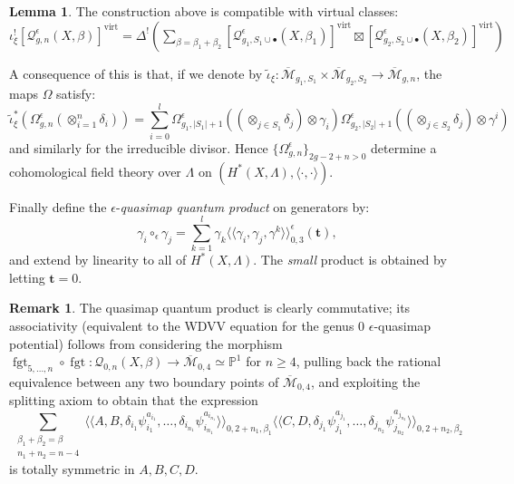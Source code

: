 \documentclass[11pt]{amsart}
\newcommand{\oM}{\overline{\mathcal{M}}}
\newcommand{\Q}[4]{\mathcal{Q}_{#1,#2}(#3,#4)}
\newcommand{\Qe}[4]{\mathcal{Q}^{\epsilon}_{#1,#2}(#3,#4)}
\newcommand{\PP}{\mathbb P}
\renewcommand{\to}{\rightarrow}
\newcommand{\virt}[1]{[#1]^{\operatorname{virt}}}
\newcommand{\lala}{\langle\!\langle}
\newcommand{\rara}{\rangle\!\rangle}
\newcommand{\fgt}{\operatorname{fgt}}
\theoremstyle{definition}
\newtheorem{lem}[thm]{Lemma}
\theoremstyle{definition}
\newtheorem{rmk}[thm]{Remark}
\begin{document}
\begin{lem} The construction above is compatible with virtual classes:
 $\iota_\xi^!\virt{\Qe{g}{n}{X}{\beta}}=\Delta^!\left(\sum_{\beta=\beta_1+\beta_2}\virt{\Qe{g_1}{S_1\cup\bullet}{X}{\beta_1}}\boxtimes\virt{\Qe{g_2}{S_2\cup\bullet}{X}{\beta_2}}\right)$
\end{lem}

A consequence of this is that, if we denote by $\tilde{\iota}_\xi\colon \oM_{g_1,S_1}\times \oM_{g_2,S_2}\to \oM_{g,n}$, the maps $\Omega$ satisfy:
\[\tilde{\iota}_\xi^*(\Omega^\epsilon_{g,n}(\otimes_{i=1}^n\delta_i))=\sum_{i=0}^l\Omega^\epsilon_{g_1,\lvert S_1\rvert+1}((\otimes_{j\in S_1}\delta_j)\otimes \gamma_i)\Omega^\epsilon_{g_2,\lvert S_2\rvert+1}((\otimes_{j\in S_2}\delta_j)\otimes \gamma^i)\]
and similarly for the irreducible divisor. Hence $\{\Omega^\epsilon_{g,n}\}_{2g-2+n>0}$ determine a cohomological field theory over $\Lambda$ on $(H^*(X,\Lambda),\langle\cdot,\cdot\rangle)$.

Finally define the $\epsilon$-\emph{quasimap quantum product} on generators by:
\[\gamma_i\circ_\epsilon \gamma_j=\sum_{k=1}^l\gamma_k\lala\gamma_i,\gamma_j,\gamma^k\rara^\epsilon_{0,3}(\mathbf{t}),\]
and extend by linearity to all of $H^*(X,\Lambda)$. The \emph{small} product is obtained by letting $\mathbf t=0$.

\begin{rmk}
 The quasimap quantum product is clearly commutative; its associativity (equivalent to the WDVV equation for the genus $0$ $\epsilon$-quasimap potential) follows from considering the morphism $\fgt_{5,\ldots,n}\circ\fgt\colon \Q{0}{n}{X}{\beta}\to\oM_{0,4}\simeq\PP^1$ for $n\geq 4$, pulling back the rational equivalence between any two boundary points of $\oM_{0,4}$, and exploiting the splitting axiom to obtain that the expression
 \[\sum_{\substack{\beta_1+\beta_2=\beta \\ n_1+n_2=n-4}}\lala A,B,\delta_{i_1}\psi_{i_1}^{a_{i_1}},\ldots,\delta_{i_{n_1}}\psi_{i_{n_1}}^{a_{i_{n_1}}}\rara_{0,2+n_1,\beta_1}\lala C,D,\delta_{j_1}\psi_{j_1}^{a_{j_1}},\ldots,\delta_{j_{n_2}}\psi_{j_{n_2}}^{a_{j_{n_2}}}\rara_{0,2+n_2,\beta_2}\]
 is totally symmetric in $A,B,C,D$.
\end{rmk}
\end{document}
